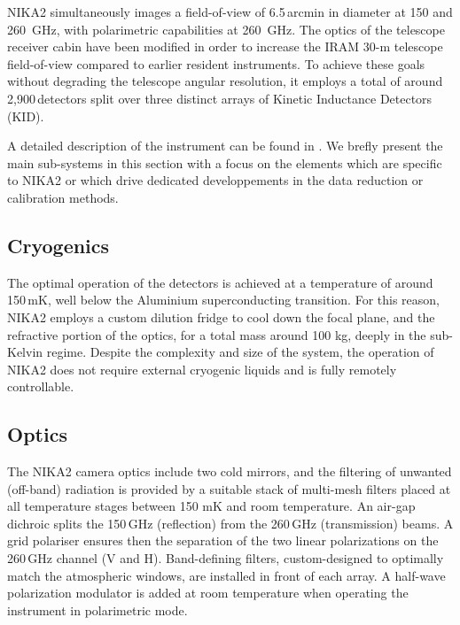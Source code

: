 
NIKA2 simultaneously images a field-of-view of
6.5\,arcmin in diameter at 150 and 260~GHz, with polarimetric capabilities at
260~GHz. The optics of the telescope receiver cabin have been modified in order
to increase the IRAM 30-m telescope field-of-view compared to earlier
resident instruments. To achieve these goals without degrading the
telescope angular resolution, it employs a total of around
2,900\,detectors split over three distinct arrays of Kinetic
Inductance Detectors (KID).

A detailed description of the instrument can be found in
\citet{Adam2018}. We brefly present the main sub-systems in this
section with a focus on the elements which are specific to NIKA2 or
which drive dedicated developpements in the data reduction or
calibration methods.


\subsection{Cryogenics}

The optimal operation of the detectors is achieved at a temperature of around
150\,mK, well below the Aluminium superconducting transition. For this reason,
NIKA2 employs a custom dilution fridge to cool down the focal plane, and the
refractive portion of the optics, for a total mass around 100 kg, deeply in the
sub-Kelvin regime. Despite the complexity and size of the system, the operation
of NIKA2 does not require external cryogenic liquids and is fully remotely
controllable.


\subsection{Optics}

The NIKA2 camera optics include two cold mirrors, and the filtering of unwanted
(off-band) radiation is provided by a suitable stack of multi-mesh filters
placed at all temperature stages between 150 mK and room temperature. An air-gap
dichroic splits the 150\,GHz (reflection) from the 260\,GHz (transmission)
beams. A grid polariser ensures then the separation of the two linear
polarizations on the 260\,GHz channel (V and H). Band-defining filters,
custom-designed to optimally match the atmospheric windows, are installed in
front of each array. A half-wave polarization modulator is added at room
temperature when operating the instrument in polarimetric mode.

